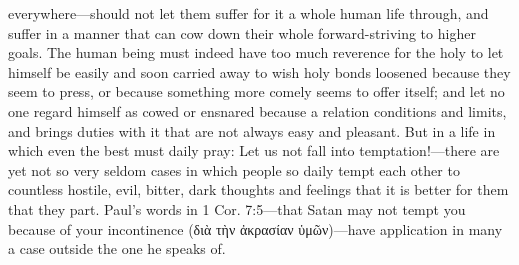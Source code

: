 \documentclass[12pt,a4paper]{book}
\begin{document}
everywhere---should not let them suffer for it a whole human life through,
and suffer in a manner that can cow down their whole forward-striving to
higher goals. The human being must indeed have too much reverence for the
holy to let himself be easily and soon carried away to wish holy bonds
loosened because they seem to press, or because something more comely seems
to offer itself; and let no one regard himself as cowed or ensnared because
a relation conditions and limits, and brings duties with it that are not
always easy and pleasant. But in a life in which even the best must daily
pray: Let us not fall into temptation!---there are yet not so very seldom
cases in which people so daily tempt each other to countless hostile, evil,
bitter, dark thoughts and feelings that it is better for them that they
part. Paul's words in 1 Cor. 7:5---that Satan may not tempt you because of
your incontinence (διὰ τὴν ἀκρασίαν ὑμῶν)---have application in many a case
outside the one he speaks of.
\end{document}

